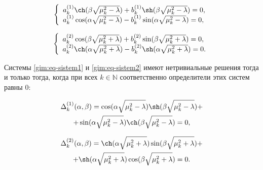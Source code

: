 \begin{equation}

\left\{\begin{array}{l}a_k^{(1)}\ch(\beta\sqrt{\mu_k^2-\lambda})+b_k^{(1)}\sh(\beta\sqrt{\mu_k^2-\lambda})=0, \\

a_k^{(1)}\cos(\alpha\sqrt{\mu_k^2-\lambda})-b_k^{(1)}\sin(\alpha\sqrt{\mu_k^2-\lambda})=0,\end{array}\right.\label{gim:eq-sistem1}

\end{equation}

\begin{equation}\left\{\begin{array}{l}a_k^{(2)}\cos(\beta\sqrt{\mu_k^2+\lambda})+b_k^{(2)}\sin(\beta\sqrt{\mu_k^2+\lambda})=0, \\

a_k^{(2)}\ch(\alpha\sqrt{\mu_k^2+\lambda})-b_k^{(2)}\sh(\alpha\sqrt{\mu_k^2+\lambda})=0.\end{array}\right.\label{gim:eq-sistem2}

\end{equation}



Системы \eqref{gim:eq-sistem1} и \eqref{gim:eq-sistem2} имеют нетривиальные решения тогда и только тогда, когда при всех $k\in \mathbb{N}$ соответственно определители этих систем равны 0:

\begin{multline}

\Delta_k^{(1)}(\alpha,\beta)=\cos(\alpha\sqrt{\mu_k^2-\lambda})  \sh(\beta\sqrt{\mu_k^2-\lambda})+

\\+

\sin(\alpha\sqrt{\mu_k^2-\lambda}) \ch(\beta\sqrt{\mu_k^2-\lambda})=0,\label{gim:eq-defk1}

\end{multline}

\begin{multline}

\Delta_k^{(2)}(\alpha,\beta)=\ch(\alpha\sqrt{\mu_k^2+\lambda}) \sin(\beta\sqrt{\mu_k^2+\lambda})+ \\ +

\sh(\alpha\sqrt{\mu_k^2+\lambda}) \cos(\beta\sqrt{\mu_k^2+\lambda})=0.\label{gim:eq-defk2}

\end{multline}



